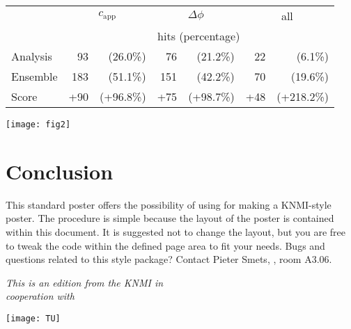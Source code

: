 \documentclass{article}
\begin{document}
\vspace{20pt plus 10pt minus 5pt}
\begin{minipage}[b]{\columnwidth}
%
\begin{center}
\begin{tabular}{l r r | r r | r r}
\hline
& \multicolumn{2}{c}{$c_{\text{app}}$} &  \multicolumn{2}{|c}{$\Delta\phi$} &  \multicolumn{2}{|c}{all} \\
\cline{2-7}
& \multicolumn{6}{c}{hits (percentage)} \\
\hline
Analysis 	& 93	&(26.0\%) & 76 & (21.2\%) &  22 & (6.1\%) \\
Ensemble & 183 &(51.1\%) & 151 & (42.2\%)  & 70 & (19.6\%) \\
Score & +90 & (+96.8\%) & +75 & (+98.7\%)  & +48 & (+218.2\%) \\
\hline
\end{tabular}
\end{center}
\label{table}
%
\end{minipage}


\vspace{20pt plus 10pt minus 5pt}
\begin{minipage}[b]{\columnwidth}\begin{center}
	\begin{center}
	\texttt{[image: fig2]}
	\label{fig2}
	\end{center}
\end{center}\end{minipage}

\section*{Conclusion}
This standard poster offers the possibility of using \latex for making a KNMI-style poster. The procedure is simple because the layout of the poster is contained within this document. It is suggested not to change the layout, but you are free to tweak the \latex code within the defined page area to fit your needs. Bugs and questions related to this \latex style package? Contact Pieter Smets, , room A3.06.

\pushdown

\begin{fminipage}{\columnwidth}
\textit{%
\noindent This is an edition from the KNMI in \\
cooperation with
} %
\begin{center}\texttt{[image: TU]}\end{center}%
\end{fminipage}

\ecols %
\end{document}
